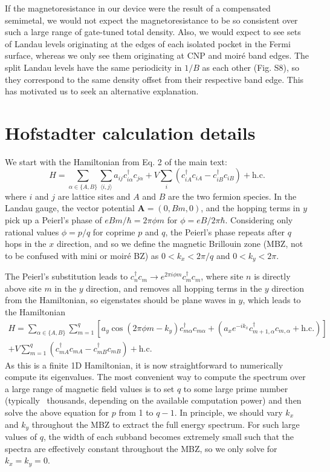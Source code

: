 \documentclass[12pt,twocolumn]{article}
\begin{document}
If the magnetoresistance in our device were the result of a compensated semimetal, we would not expect the magnetoresistance to be so consistent over such a large range of gate-tuned total density. Also, we would expect to see sets of Landau levels originating at the edges of each isolated pocket in the Fermi surface, whereas we only see them originating at CNP and moiré band edges. The split Landau levels have the same periodicity in $1/B$ as each other (Fig. S8), so they correspond to the same density offset from their respective band edge. This has motivated us to seek an alternative explanation.

\section{Hofstadter calculation details}
We start with the Hamiltonian from Eq. 2 of the main text:
\begin{equation}
H = \sum_{\alpha\in\{A,B\}}\sum_{\langle i,j \rangle}a_{ij}c_{i\alpha}^\dagger c_{j\alpha} + V\sum_i\left(c_{iA}^\dagger c_{iA} - c_{iB}^\dagger c_{iB}\right)+ \mathrm{h.c.}
\label{eq:two_species_toy_model}
\end{equation}
where $i$ and $j$ are lattice sites and $A$ and $B$ are the two fermion species. In the Landau gauge, the vector potential $\mathbf{A}=(0,Bm,0)$, and the hopping terms in $y$ pick up a Peierl’s phase of $eBm/\hbar=2\pi \phi m$ for $\phi=eB/2\pi\hbar$. Considering only rational values $\phi=p/q$ for coprime $p$ and $q$, the Peierl’s phase repeats after $q$ hops in the $x$ direction, and so we define the magnetic Brillouin zone (MBZ, not to be confused with mini or moiré BZ) as $0<k_x<2\pi/q$ and $0<k_y<2\pi$.

The Peierl’s substitution leads to $c_n^\dagger c_m \rightarrow e^{2\pi i\phi m}c_m^\dagger c_m$, where site $n$ is directly above site $m$ in the $y$ direction, and removes all hopping terms in the $y$ direction from the Hamiltonian, so eigenstates should be plane waves in $y$, which leads to the Hamiltonian
\begin{multline*}
H = \sum_{\alpha\in\{A,B\}}\sum_{m=1}^q\left[ a_y\cos (2\pi \phi m-k_y) c_{m\alpha}^\dagger c_{m\alpha} + (a_xe^{-ik_x}c^\dagger_{m+1,\alpha}c_{m,\alpha} + \mathrm{h.c.})\right]\\ + V\sum_{m=1}^q\left(c_{mA}^\dagger c_{mA} - c_{mB}^\dagger c_{mB}\right)+ \mathrm{h.c.}
\end{multline*}
As this is a finite 1D Hamiltonian, it is now straightforward to numerically compute its eigenvalues. The most convenient way to compute the spectrum over a large range of magnetic field values is to set $q$ to some large prime number (typically ~thousands, depending on the available computation power) and then solve the above equation for $p$ from 1 to $q - 1$. In principle, we should vary $k_x$ and $k_y$ throughout the MBZ to extract the full energy spectrum. For such large values of $q$, the width of each subband becomes extremely small such that the spectra are effectively constant throughout the MBZ, so we only solve for $k_x=k_y=0$.
\end{document}
